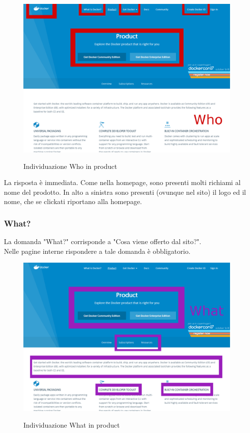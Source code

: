 \documentclass[a4paper]{article}
\begin{document}
\begin{figure}[H]
	\centering
	\includegraphics[width=\linewidth]{images/productwho.png}
    \label{fig:productwho}
    \caption{Individuazione Who in product}
\end{figure}

\noindent La risposta è immediata. Come nella homepage, sono presenti molti richiami al nome del prodotto. In alto a sinistra sono presenti (ovunque nel sito) il logo ed il nome, che se clickati riportano alla homepage.

\newpage
\subsubsection{What?}
La domanda "What?" corrisponde a "Cosa viene offerto dal sito?".
\\
Nelle pagine interne rispondere a tale domanda è obbligatorio.

\begin{figure}[H]
	\centering
	\includegraphics[width=\linewidth]{images/productwhat1.png}
    \label{fig:productwhat1}
    \caption{Individuazione What in product}
\end{figure}
\end{document}
